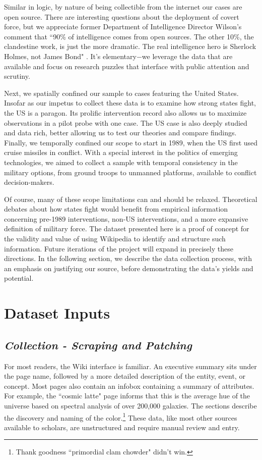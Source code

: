 \documentclass[fleqn,12pt]{article}
\begin{document}
Similar in logic, by nature of being collectible from the internet our cases are open source. There are interesting questions about the deployment of covert force, but we appreciate former Department of Intelligence Director Wilson's comment that ``90\% of intelligence comes from open sources. The other 10\%, the clandestine work, is just the more dramatic. The real intelligence hero is Sherlock Holmes, not James Bond" \citep{lands_publiclyavailableinformation_2019}. It's elementary$-$we leverage the data that are available and focus on research puzzles that interface with public attention and scrutiny.

Next, we spatially confined our sample to cases featuring the United States. Insofar as our impetus to collect these data is to examine how strong states fight, the US is a paragon. Its prolific intervention record also allows us to maximize observations in a pilot probe with one case. The US case is also deeply studied and data rich, better allowing us to test our theories and compare findings. Finally, we temporally confined our scope to start in 1989, when the US first used cruise missiles in conflict. With a special interest in the politics of emerging technologies, we aimed to collect a sample with temporal consistency in the military options, from ground troops to unmanned platforms, available to conflict decision-makers.

Of course, many of these scope limitations can and should be relaxed. Theoretical debates about how states fight would benefit from empirical information concerning pre-1989 interventions, non-US interventions, and a more expansive definition of military force. The dataset presented here is a proof of concept for the validity and value of using Wikipedia to identify and structure such information. Future iterations of the project will expand in precisely these directions. In the following section, we describe the data collection process, with an emphasis on justifying our source, before demonstrating the data's yields and potential.

\section*{Dataset Inputs}
\subsection*{\textit{Collection - Scraping and Patching}}
For most readers, the Wiki interface is familiar. An executive summary sits under the page name, followed by a more detailed description of the entity, event, or concept. Most pages also contain an infobox containing a summary of attributes. For example, the ``cosmic latte" page informs that this is the average hue of the universe based on spectral analysis of over 200,000 galaxies. The sections describe the discovery and naming of the color.\footnote{Thank goodness ``primordial clam chowder" didn't win.} These data, like most other sources available to scholars, are unstructured and require manual review and entry.
\end{document}

